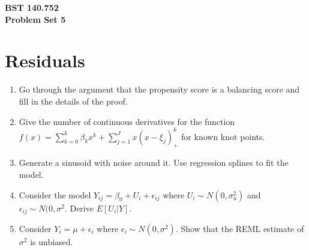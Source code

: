 \documentclass[12pt]{article}
\begin{document}
\noindent
{\bf BST 140.752 \\ Problem Set 5} \\
\section{Residuals}
\begin{enumerate}
\item Go through the argument that the propensity score is a balancing score and fill in the details of the proof.
\item Give the number of continuous derivatives for the function $f(x) = \sum_{k=0}^k \beta_k x^k + \sum_{j=1}^J x (x - \xi_j)^k_+$ for known knot points.
\item Generate a sinusoid with noise around it. Use regression splines to fit the model.
\item Consider the model $Y_{ij} = \beta_0 + U_i + \epsilon_{ij}$ where $U_i \sim N(0, \sigma_u^2)$
and $\epsilon_{ij} \sim N(0,\sigma^2$. Derive $E[U_i | Y]$.
\item Consider $Y_i = \mu + \epsilon_i$ where $\epsilon_i \sim N(0, \sigma^2)$. Show that the REML
estimate of $\sigma^2$ is unbiased.
\end{enumerate}
\end{document}
